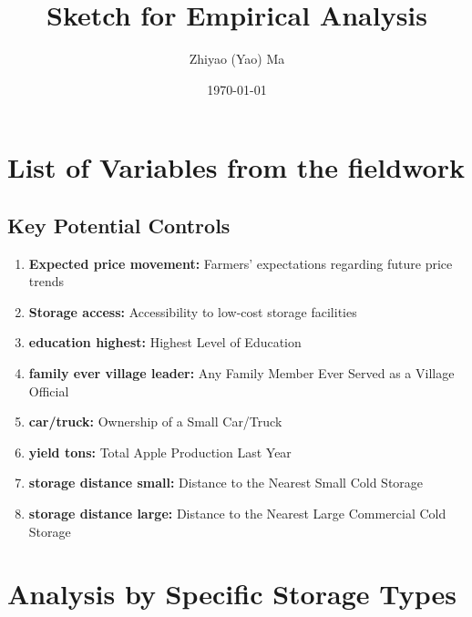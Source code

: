 \documentclass[12pt]{article}
\title{Sketch for Empirical Analysis}
\author{Zhiyao (Yao) Ma}
\date{\today}
\begin{document}
\maketitle


\section{List of Variables from the fieldwork}


\subsection{Key Potential Controls}
\begin{enumerate}
    \item \textbf{Expected price movement:} Farmers’ expectations regarding future price trends
    \item \textbf{Storage access:} Accessibility to low-cost storage facilities
    \item \textbf{education highest:} Highest Level of Education
    \item \textbf{family ever village leader:} Any Family Member Ever Served as a Village Official
    \item \textbf{car/truck:} Ownership of a Small Car/Truck
    \item \textbf{yield tons:} Total Apple Production Last Year
    \item \textbf{storage distance small:} Distance to the Nearest Small Cold Storage
    \item \textbf{storage distance large:} Distance to the Nearest Large Commercial Cold Storage
\end{enumerate}







\newpage
\section{Analysis by Specific Storage Types}


\end{document}
